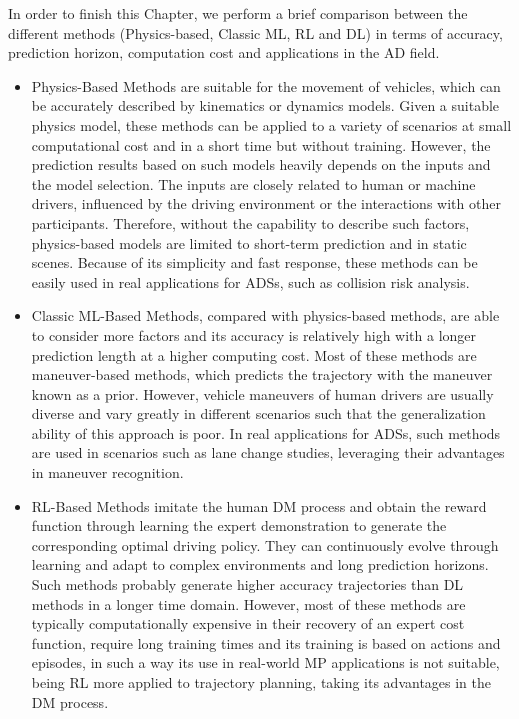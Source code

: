 In order to finish this Chapter, we perform a brief comparison between the different methods (Physics-based, Classic \ac{ML}, \ac{RL} and \ac{DL}) in terms of accuracy, prediction horizon, computation cost and applications in the \ac{AD} field. 

\begin{itemize}
	
	\item Physics-Based Methods are suitable for the movement of vehicles, which can be accurately described by kinematics or dynamics models. Given a suitable physics model, these methods can be applied to a variety of scenarios at small computational cost and in a short time but without training. However, the prediction results based on such models heavily depends on the inputs and the model selection. The inputs are closely related to human or machine drivers, influenced by the driving environment or the interactions with other participants. Therefore, without the capability to describe such factors, physics-based models are limited to short-term prediction and in static scenes. Because of its simplicity and fast response, these methods can be easily used in real applications for \acp{ADS}, such as collision risk analysis.
	
	\item Classic \ac{ML}-Based Methods, compared with physics-based methods, are able to consider more factors and its accuracy is relatively high with a longer prediction length at a higher computing cost. Most of these methods are maneuver-based methods, which predicts the trajectory with the maneuver known as a prior. However, vehicle maneuvers of human drivers are usually diverse and vary greatly in different scenarios such that the generalization ability of this approach is poor. In real applications for \acp{ADS}, such methods are used in scenarios such as lane change studies, leveraging their advantages in maneuver recognition.
	
	\item \ac{RL}-Based Methods imitate the human \ac{DM} process and obtain the reward function through learning the expert demonstration to generate the corresponding optimal driving policy. They can continuously evolve through learning and adapt to complex environments and long prediction horizons. Such methods probably generate higher accuracy trajectories than \ac{DL} methods in a longer time domain. However, most of these methods are typically computationally expensive in their recovery of an expert cost function, require long training times and its training is based on actions and episodes, in such a way its use in real-world \ac{MP} applications is not suitable, being \ac{RL} more applied to trajectory planning, taking its advantages in the \ac{DM} process.
	

\end{itemize}
